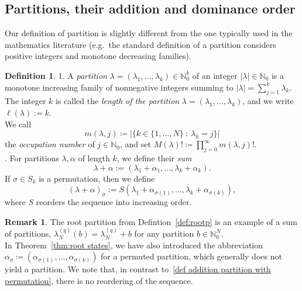\documentclass[letterpaper, DIV=17]{scrartcl}
\numberwithin{equation}{section}
\theoremstyle{definition}
\newtheorem{defn}{Definition}[section]
\newtheorem{rem}[theorem]{Remark}
\begin{document}
\subsection{Partitions, their addition and dominance order} 
%				
Our definition of partition is slightly different from the one typically used in the mathematics literature (e.g.\ the standard definition of a partition considers positive integers and monotone decreasing families). 
%	
		\begin{defn}\label{def:partitions}
		1. A \emph{partition} $\lambda=(\lambda_1, \dots, \lambda_k) \in \mathbb{N}_0^k$ of an integer $|\lambda| \in \mathbb{N}_0 $ is a monotone increasing family of nonnegative integers summing to $|\lambda| = \sum_{j=1}^k \lambda_k $. 		The integer $k$ is called the \emph{length of the partition} $\lambda=(\lambda_1, \dots, \lambda_k)$, and we write $\ell(\lambda):=k$.\\
		We call
			\begin{equation}\label{def:occupation}
				m(\lambda, j) \coloneqq \vert \{ k\in \{1, \dots, N \} \ : \ \lambda_k = j\} \vert 
			\end{equation}
			the \emph{occupation number} of $j\in \mathbb{N}_0$, and set $ M(\lambda)! \coloneqq \prod_{j=0}^\infty m(\lambda, j)! $. \\
%
. For partitions $\lambda, \alpha$ of length $k$,  we define their \emph{sum}
		\begin{equation} \label{def addition partitions}
			\lambda+\alpha :=(\lambda_1+\alpha_1, \dots, \lambda_k + \alpha_k).
		\end{equation}
		If $\sigma\in S_k$ is a permutation, then we define
		\begin{equation} \label{def addition partition with permutation}
			(\lambda+\alpha)_\sigma := S(\lambda_1+\alpha_{\sigma(1)}, \dots, \lambda_k+\alpha_{\sigma(k)}),
		\end{equation}
		where $S$ reorders the sequence into increasing order.
\end{defn}
\begin{rem}
The root partition from Defintion~\ref{def:rootp} is an example of a sum of partitions,  $   \lambda^{(q)}_N(b) =  \lambda^{(q)}_N + b $ for any partition $ b \in \mathbb{N}_0^N $.\\
In Theorem~\ref{thm:root states}, we have also introduced the abbreviation  $\alpha_\sigma \coloneqq  (\alpha_{\sigma(1)}, \dots, \alpha_{\sigma(k)}) $ for a permuted partition, which generally does not yield a partition. We note that, in contrast to~\eqref{def addition partition with permutation}, there is no reordering of the sequence. 
\end{rem}
\end{document}
